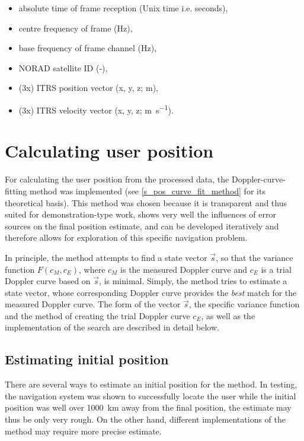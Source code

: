 \begin{itemize}
    \item absolute time of frame reception (Unix time i.e. seconds),
    \item centre frequency of frame (Hz),
    \item base frequency of frame channel (Hz),
    \item NORAD satellite ID (-),
    \item (3x) ITRS position vector (x, y, z; m),
    \item (3x) ITRS velocity vector (x, y, z; \unit{\m\per\s}).
\end{itemize}



\section{Calculating user position}
For calculating the user position from the processed data, the Doppler-curve-fitting method was implemented (see \autoref{s_pos_curve_fit_method} for its theoretical basis). This method was chosen because it is transparent and thus suited for demonstration-type work, shows very well the influences of error sources on the final position estimate, and can be developed iteratively and therefore allows for exploration of this specific navigation problem.

In principle, the method attempts to find a state vector $\Vec{s}$, so that the variance function $F(c_M, c_E)$, where $c_M$ is the measured Doppler curve and $c_E$ is a trial Doppler curve based on $\Vec{s}$, is minimal. Simply, the method tries to estimate a state vector, whose corresponding Doppler curve provides the \textit{best} match for the measured Doppler curve. The form of the vector $\Vec{s}$, the specific variance function and the method of creating the trial Doppler curve $c_E$, as well as the implementation of the search are described in detail below.

\subsection{Estimating initial position}
There are several ways to estimate an initial position for the method. In testing, the navigation system was shown to successfully locate the user while the initial position was well over \qty{1000}{km} away from the final position, the estimate may thus be only very rough. On the other hand, different implementations of the method may require more precise estimate.

